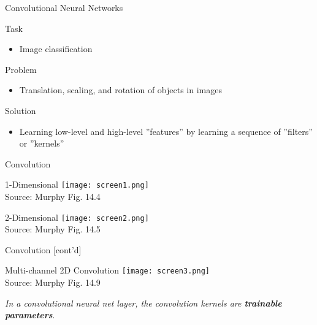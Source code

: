 \documentclass[ignorenonframetext,xcolor=x11names]{beamer}
\begin{document}
\begin{frame}{Convolutional Neural Networks}
\begin{block}{Task}
\begin{itemize}
   \item Image classification
\end{itemize}
\end{block}
\begin{block}{Problem}
\begin{itemize}
   \item Translation, scaling, and rotation of objects in images
\end{itemize}
\end{block}
\begin{block}{Solution}
\begin{itemize}
   \item Learning low-level and high-level ''features'' by learning a sequence of ''filters'' or ''kernels''
\end{itemize}
\end{block}
\end{frame}

\begin{frame}{Convolution}
\begin{block}{1-Dimensional}
\centering
\texttt{[image: screen1.png]} \\

\scriptsize Source: Murphy Fig. 14.4 \normalsize
\end{block}
\begin{block}{2-Dimensional}
\centering
\texttt{[image: screen2.png]} \\

\scriptsize Source: Murphy Fig. 14.5
\end{block}
\end{frame}

\begin{frame}{Convolution \small [cont'd]}
\begin{block}{Multi-channel 2D Convolution}
\centering
\texttt{[image: screen3.png]} \\

\scriptsize Source: Murphy Fig. 14.9
\end{block}
\vspace{\baselineskip}
\emph{In a convolutional neural net layer, the convolution kernels are \textbf{trainable parameters}}.
\end{frame}
\end{document}

